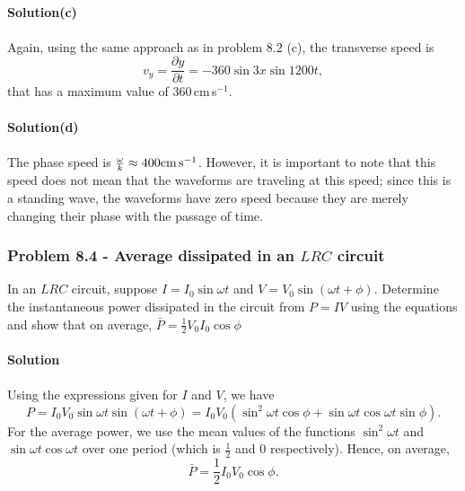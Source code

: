 \documentclass{article}
\begin{document}
\\\textbf{Solution(c)}
\\
\\Again, using the same approach as in problem 8.2 (c), the transverse speed is \[v_y=\frac{\partial y}{\partial t}=-360\sin3x\sin1200t,\] that has a maximum value of 360\,cm\,s$^{-1}$.
\\
\\\textbf{Solution(d)}
\\
\\The phase speed is $\frac{\omega}{k}\approx400\text{cm\,s}^{-1}$. However, it is important to note that this speed does not mean that the waveforms are traveling at this speed; since this is a standing wave, the waveforms have zero speed because they are merely changing their phase with the passage of time.

\subsubsection*{Problem 8.4 - Average dissipated in an $LRC$ circuit}
In an $LRC$ circuit, suppose $I=I_0\sin\omega t$ and $V=V_0\sin(\omega t+\phi)$. Determine the instantaneous power
dissipated in the circuit from $P=IV$ using the equations and show that on average, $\bar{P}=\frac{1}{2}V_0I_0\cos\phi$
\\
\\\textbf{Solution}
\\
\\Using the expressions given for $I$ and $V$, we have
\[P=I_0V_0\sin\omega t\sin(\omega t+\phi)=I_0V_0\left(\sin^2\omega t\cos\phi+\sin\omega t\cos\omega t\sin\phi\right).\]
For the average power, we use the mean values of the functions $\sin^2\omega t$ and $\sin\omega t\cos\omega t$ over one period (which is $\frac{1}{2}$ and 0 respectively). Hence, on average,
\begin{equation}
    \bar{P}=\frac{1}{2}I_0V_0\cos\phi.
\end{equation}
\end{document}

